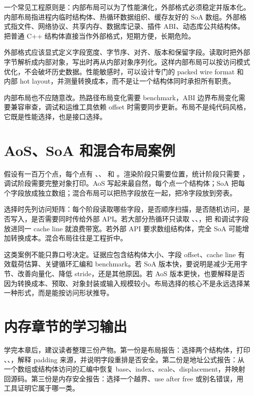 一个常见工程原则是：内部布局可以为了性能演化，外部格式必须稳定并版本化。内部布局指进程内临时结构体、热循环数据组织、缓存友好的 SoA 数组。外部格式指文件、网络协议、共享内存、数据库记录、插件 ABI、动态库公共结构体。把普通 C++ 结构体直接当作外部格式，短期方便，长期危险。

外部格式应该显式定义字段宽度、字节序、对齐、版本和保留字段。读取时把外部字节解析成内部对象，写出时再从内部对象序列化。这样内部布局可以按访问模式优化，不会破坏历史数据。性能敏感时，可以设计专门的 packed wire format 和内部 hot layout，并测量转换成本，而不是让一个结构体同时承担所有职责。

内部布局也不应随意改。热路径布局变化需要 benchmark，ABI 边界布局变化需要兼容审查，调试和运维工具依赖 offset 时需要同步更新。布局不是纯代码风格，它既是性能选择，也是接口选择。

\section{AoS、SoA 和混合布局案例}

假设有一百万个点，每个点有 、、 和 。渲染阶段只需要位置，统计阶段只需要 ，调试阶段需要完整对象打印。AoS 写起来最自然，每个点一个结构体；SoA 把每个字段放成独立数组；混合布局可以把热字段放在一起，把冷字段放到旁表。

选择时先列访问矩阵：每个阶段读取哪些字段，是否顺序扫描，是否随机访问，是否写入，是否需要同时传给外部 API。若大部分热循环只读取 、、，把  和调试字段放进同一 cache line 就浪费带宽。若外部 API 要求数组结构体，完全 SoA 可能增加转换成本。混合布局往往是工程折中。

这类案例不能只靠口号决定。证据应包含结构体大小、字段 offset、cache line 有效载荷估算、关键循环汇编和 benchmark。若 SoA 版本快，要说明是减少无用字节、改善向量化、降低 stride，还是其他原因。若 AoS 版本更快，也要解释是否因为转换成本、预取、对象封装或输入规模较小。布局选择的核心不是永远选择某一种形式，而是能按访问形状推导。

\section{内存章节的学习输出}

学完本章后，建议读者整理三份产物。第一份是布局报告：选择两个结构体，打印 、、，解释 padding 来源，并说明字段重排是否安全。第二份是地址公式报告：从一个数组或结构体访问的汇编中恢复 base、index、scale、displacement，并映射回源码。第三份是内存安全报告：选择一个越界、use after free 或别名错误，用工具证明它属于哪一类。

